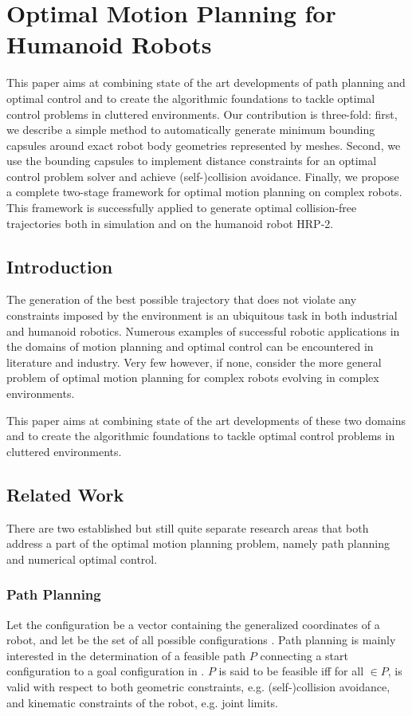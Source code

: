 \renewcommand{\manifold}{$\mathcal{M}$}
\renewcommand{\goalmanifold}{$\mathcal{M}_{g}$}

\chapter{Optimal Motion Planning for Humanoid Robots}
\label{chap:optimal-motion-planning}

This paper aims at combining state of the art developments of path
planning and optimal control and to create the algorithmic foundations
to tackle optimal control problems in cluttered environments. Our
contribution is three-fold: first, we describe a simple method to
automatically generate minimum bounding capsules around exact robot
body geometries represented by meshes. Second, we use the bounding
capsules to implement distance constraints for an optimal control
problem solver and achieve (self-)collision avoidance. Finally, we
propose a complete two-stage framework for optimal motion planning on
complex robots. This framework is successfully applied to generate
optimal collision-free trajectories both in simulation and on the
humanoid robot HRP-2.

\section{Introduction}
The generation of the best possible trajectory that does not violate
any constraints imposed by the environment is an ubiquitous task in
both industrial and humanoid robotics. Numerous examples of successful
robotic applications in the domains of motion planning and optimal
control can be encountered in literature and industry. Very few
however, if none, consider the more general problem of optimal motion
planning for complex robots evolving in complex environments.

This paper aims at combining state of the art developments of these
two domains and to create the algorithmic foundations to tackle
optimal control problems in cluttered environments.

\section{Related Work}
There are two established but still quite separate research areas that
both address a part of the optimal motion planning problem, namely
path planning and numerical optimal control.

\subsection{Path Planning}
Let the configuration \config{} be a vector containing the generalized
coordinates of a robot, and let \cspace\enspace be the set of all
possible configurations \config{}. Path planning is mainly interested
in the determination of a feasible path $P$ connecting a start
configuration  to a goal configuration  in
\cspace. $P$ is said to be feasible iff for all \config{} $\in
P$, \config{} is valid with respect to both geometric constraints,
e.g. (self-)collision avoidance, and kinematic constraints of the
robot, e.g. joint limits.


